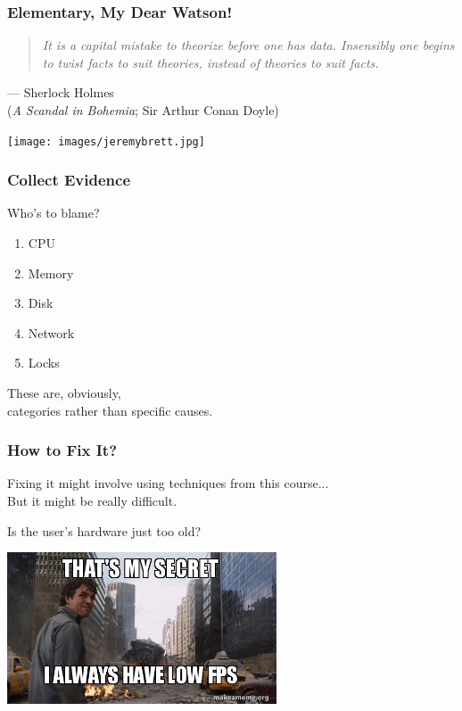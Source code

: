 \begin{frame}
\frametitle{Elementary, My Dear Watson!}



\begin{quote}
\textit{It is a capital mistake to theorize before one has data. Insensibly one begins to twist facts to suit theories, instead of theories to suit facts.}
\end{quote}
\hfill --- Sherlock Holmes\\
\hfill (\textit{A Scandal in Bohemia}; Sir Arthur Conan Doyle)


\begin{center}
	\texttt{[image: images/jeremybrett.jpg]}
\end{center}

\end{frame}



\begin{frame}
\frametitle{Collect Evidence}



Who's to blame?
\begin{enumerate}
	\item CPU
	\item Memory
	\item Disk
	\item Network
	\item Locks
\end{enumerate}

These are, obviously, \\
categories rather than specific causes.

\end{frame}

\begin{frame}
\frametitle{How to Fix It?}

Fixing it might involve using techniques from this course...\\
\quad But it might be really difficult.

Is the user's hardware just too old?

\begin{center}
  \includegraphics[width=0.6\textwidth]{images/hulk.jpg}
\end{center}

\end{frame}

